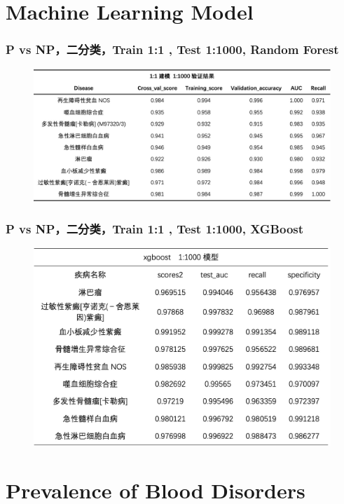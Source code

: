 \documentclass[UTF8,aspectratio=1610,10pt]{ctexbeamer}
\begin{document}
\section{Machine Learning Model}
\begin{frame}
\frametitle{P vs NP，二分类，Train 1:1 , Test 1:1000, Random Forest}
\begin{figure}
\centering
\includegraphics[width=\textwidth]{images/1to1-1t1000.jpg}	
\end{figure}
\end{frame}

\begin{frame}
\frametitle{P vs NP，二分类，Train 1:1 , Test 1:1000, XGBoost}
\begin{figure}
\centering
\includegraphics[width=.75\textwidth]{images/xgboost-1t1000.jpg}	
\end{figure}
\end{frame}


\section{Prevalence of Blood Disorders}
\end{document}
